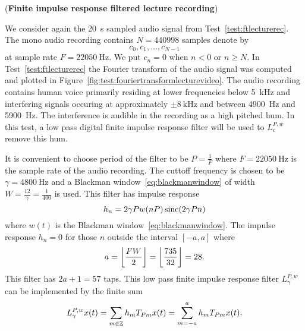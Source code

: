 \begin{test}\label{test:firfilteredlecturerec}
(\textbf{Finite impulse response filtered lecture recording})

We consider again the \SI{20}{\second} sampled audio signal from Test~\ref{test:ftlecturerec}.  The mono audio recording contains $N = 440998$ samples denote by 
\[
c_0,c_1,\dots,c_{N-1}
\]
at sample rate $F = \SI{22050}{\hertz}$.  We put $c_n = 0$ when $n < 0$ or $n \geq N$.  In Test~\ref{test:ftlecturerec} the Fourier transform of the audio signal was computed and plotted in Figure~\ref{fig:test:fouriertransformlecturevideo}. The audio recording contains human voice primarily residing at lower frequencies below \SI{5}{\kilo\hertz} and interfering signals occuring at approximately $\pm\SI{8}{\kilo\hertz}$ and between \SI{4900}{\hertz} and \SI{5900}{\hertz}.  The interference is audible in the recording as a high pitched hum.  In this test, a low pass digital finite impulse response filter will be used to $L_{c}^{P,w}$ remove this hum.

It is convenient to choose period of the filter to be $P = \tfrac{1}{F}$ where $F = \SI{22050}{\hertz}$ is the sample rate of the audio recording.  The cuttoff frequency is chosen to be $\gamma = \SI{4800}{\hertz}$ and a Blackman window~\eqref{eq:blackmanwindow} of width $W=\tfrac{12}{\gamma} = \tfrac{1}{400}$ is used.  This filter has impulse response
\[
h_n = 2 \gamma P w( nP ) \operatorname{sinc}( 2\gamma P n)
\]
where $w(t)$ is the Blackman window~\eqref{eq:blackmanwindow}.  The impulse response $h_n = 0$ for those $n$ outside the interval $[-a,a]$ where
\[
a = {\left\lfloor \frac{FW}{2} \right\rfloor} = {\left\lfloor \frac{735}{32} \right\rfloor} = 28.
\] 
This filter has $2a+1 = 57$ taps.  This low pass finite impulse response filter $L_\gamma^{P,w}$ can be implemented by the finite sum
\[
L_\gamma^{P,w}x(t) = \sum_{m \in {\mathbb Z}} h_m T_{Pm}x(t) = \sum_{m = -a}^a h_m T_{Pm}x(t) .
\]


\end{test}
